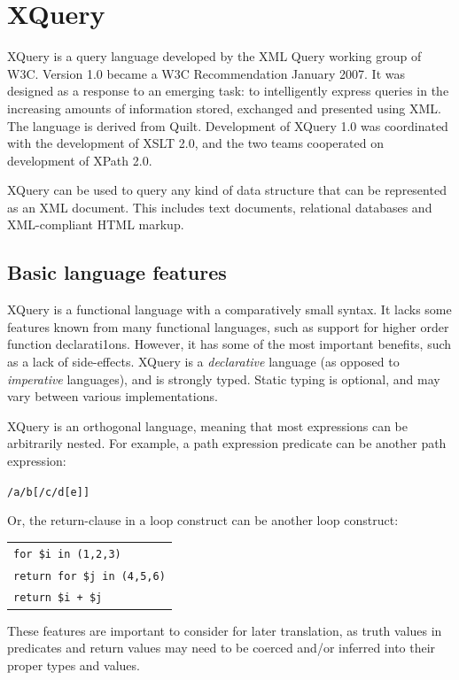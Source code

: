 \section{XQuery}
\label{sect:theory:xquery}

XQuery is a query language developed by the XML Query working group of W3C.
Version 1.0\cite{w3c00} became a W3C Recommendation January 2007. It was
designed as a response to an emerging task: to intelligently express queries in
the increasing amounts of information stored, exchanged and presented using
XML. The language is derived from Quilt\cite{quilt_queryLanguage}. Development
of XQuery 1.0 was coordinated with the development of XSLT 2.0, and the two
teams cooperated on development of XPath 2.0.

XQuery can be used to query any kind of data structure that can be represented
as an XML document. This includes text documents, relational databases and XML-compliant HTML markup.

\subsection{Basic language features}
\label{sect:theory:xquery:basics}
XQuery is a functional language with a comparatively small syntax. It lacks
some features known from many functional languages, such as support for higher
order function declarati1ons. However, it has some of the most important
benefits, such as a lack of side-effects. XQuery is a \textit{declarative} language (as opposed to \textit{imperative} languages), and
is strongly typed. Static typing is optional, and may vary between various
implementations.


XQuery is an orthogonal language, meaning that most expressions can be
arbitrarily nested. For example, a path expression predicate can be another
path expression:
\begin{center}
\texttt{/a/b[/c/d[e]]}
\end{center}
Or, the return-clause in a loop construct can be another loop
construct:
\begin{center}
\begin{tabular}{l}
\texttt{for \$i in (1,2,3) } \\ \quad 
\texttt{return for \$j in (4,5,6)} \\ \quad\quad 
\texttt{return \$i + \$j}
\end{tabular}
\end{center}

These features are important to consider for later translation, as truth values
in predicates and return values may need to be coerced and/or inferred into
their proper types and values.

